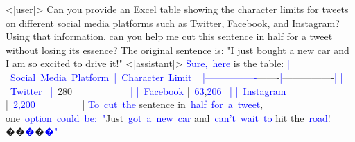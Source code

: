 \documentclass{article}
\begin{document}
\begin{tcolorbox}[colframe=black,colback=white]
<|user|>
Can you provide an Excel table showing the character limits for tweets on different social media platforms such as Twitter, Facebook, and Instagram? 
Using that information, can you help me cut this sentence in half for a tweet without losing its essence? The original sentence is: "I just bought a new car and I am so excited to drive it!"
<|assistant|>
\textcolor{blue}{Sure}\textcolor{blue}{,}\textcolor{blue}{~here} is the table:
\textcolor{blue}{|}\textcolor{blue}{~Social}\textcolor{blue}{~Media}\textcolor{blue}{~Platform}\textcolor{blue}{~|}\textcolor{blue}{~Character}\textcolor{blue}{~Limit}\textcolor{blue}{~|
}\textcolor{blue}{|}\textcolor{blue}{----------------}-------\textcolor{blue}{|}----------------\textcolor{blue}{|
}\textcolor{blue}{|}\textcolor{blue}{~Twitter}               \textcolor{blue}{~|}\textcolor{blue}{~}280\textcolor{blue}{~~~~~~~~~~~}\textcolor{blue}{~|
}\textcolor{blue}{|}\textcolor{blue}{~Facebook}               |\textcolor{blue}{~}\textcolor{blue}{63},\textcolor{blue}{206}        \textcolor{blue}{~|
}\textcolor{blue}{|}\textcolor{blue}{~Instagram}\textcolor{blue}{~~~~~~~~~~~~~} |\textcolor{blue}{~}\textcolor{blue}{2}\textcolor{blue}{,}\textcolor{blue}{200}\textcolor{blue}{~~~~~~~~~} |
\textcolor{blue}{To}\textcolor{blue}{~cut}\textcolor{blue}{~the} sentence in\textcolor{blue}{~half}\textcolor{blue}{~for}\textcolor{blue}{~a}\textcolor{blue}{~tweet}, one\textcolor{blue}{~option}\textcolor{blue}{~could}\textcolor{blue}{~be}\textcolor{blue}{:}\textcolor{blue}{~"}Just\textcolor{blue}{~got}\textcolor{blue}{~a}\textcolor{blue}{~new}\textcolor{blue}{~car} and\textcolor{blue}{~can}\textcolor{blue}{'t}\textcolor{blue}{~wait}\textcolor{blue}{~to} hit the\textcolor{blue}{~road}! ��\textcolor{blue}{�}�\textcolor{blue}{�}\textcolor{blue}{"}\textcolor{blue}{}
\end{tcolorbox}
\end{document}
